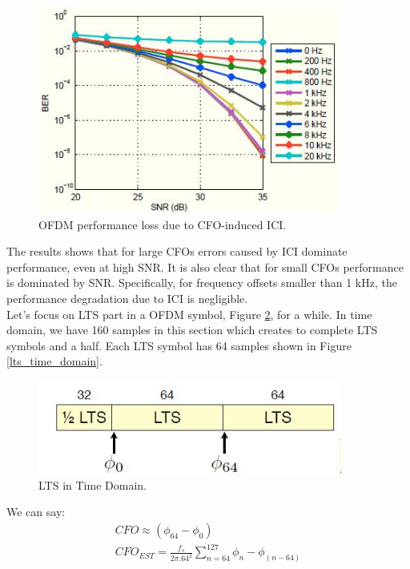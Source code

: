 \begin{figure}[h!]
\centering
\includegraphics[width=10cm]{content/fig/cfo_on_ici.JPG}
\caption{OFDM performance loss due to CFO-induced ICI.}
\label{fig:cfo_impact_on_ici}
\end{figure}

The results shows that for large CFOs errors caused by ICI dominate performance, even at high SNR. It is also
clear that for small CFOs performance is dominated by SNR. Specifically, for frequency offsets smaller than 1 kHz, the
performance degradation due to ICI is negligible.\\
Let's focus on LTS part in a OFDM symbol, Figure \ref{fig:lts_time_domain}, for a while. In time domain, we have 160 samples in this section which creates to complete LTS symbols and a half. Each LTS symbol has 64 samples shown in Figure \ref{lts_time_domain}.\\

\begin{figure}[h!]
\centering
\includegraphics[width=10cm]{content/fig/LTS_time_domain.JPG}
\caption{LTS in Time Domain.}
\label{fig:lts_time_domain}
\end{figure}

We can say:
\begin{equation} \label{cfo_cal}
\begin{split}
CFO \approx (\phi_{64}- \phi_{0})\\
CFO_{EST} = \frac{f_{s}}{2\pi . 64^{2}} \sum\limits_{n=64}^{127} \phi_{n}- \phi_{(n-64)}\\
\end{split}
\end{equation}


